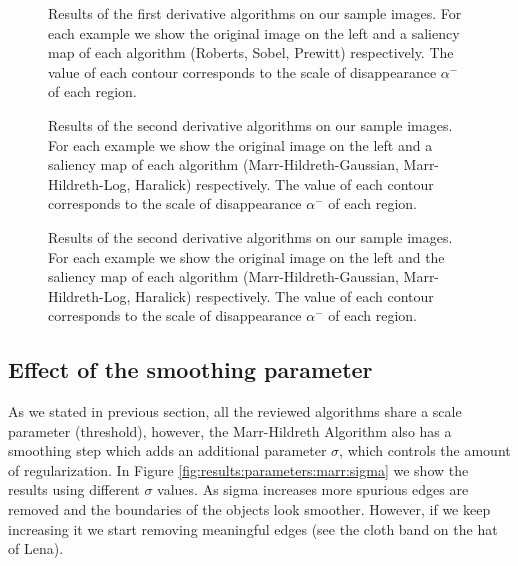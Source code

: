 \documentclass{ipol}
\numberwithin{equation}{section}
\numberwithin{table}{section}
\begin{document}
\begin{figure}[ht]
  \centering
{}
  \caption{Results of the first derivative algorithms on our sample images. For each example we show the original image on the left and a saliency map of each algorithm (Roberts, Sobel, Prewitt) respectively.
  The value of each contour corresponds to the scale of disappearance  $\alpha^-$ of each region.}
  \label{fig:results:parameters:first:saliency:b}
\end{figure}

\begin{figure}[ht]
  \centering
{}
  \caption{Results of the second derivative algorithms on our sample images. For each example we show the original image on the left and a saliency map of each algorithm (Marr-Hildreth-Gaussian, Marr-Hildreth-Log, Haralick) respectively.
  The value of each contour corresponds to the scale of disappearance  $\alpha^-$ of each region.}
  \label{fig:results:parameters:second:saliency:a}
\end{figure}

\begin{figure}[ht]
  \centering
{}
  \caption{Results of the second derivative algorithms on our sample images. For each example we show the original image on the left and the saliency map of each algorithm (Marr-Hildreth-Gaussian, Marr-Hildreth-Log, Haralick) respectively.
  The value of each contour corresponds to the scale of disappearance  $\alpha^-$ of each region.}
  \label{fig:results:parameters:second:saliency:b}
\end{figure}

\subsection{Effect of the smoothing parameter}
\myn{\label{results:parameter:smooth}}As we stated in previous section, all the reviewed algorithms share a scale parameter (threshold), however, the Marr-Hildreth Algorithm also has a smoothing step which adds an additional parameter $\sigma$, which controls the amount of regularization. In Figure \ref{fig:results:parameters:marr:sigma} we show the results using different  $\sigma$ values. As sigma increases more spurious edges are removed and the boundaries of the objects look smoother. However, if we keep increasing it we start removing meaningful edges (see the cloth band on the hat of Lena).
\end{document}
